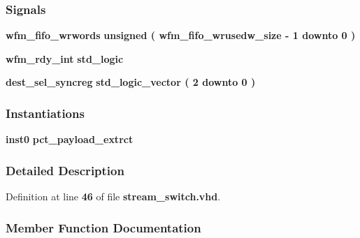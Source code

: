 \subsubsection*{Signals}
 \begin{DoxyCompactItemize}
\item 
{\bf wfm\+\_\+fifo\+\_\+wrwords} {\bfseries \textcolor{comment}{unsigned}\textcolor{vhdlchar}{ }\textcolor{vhdlchar}{(}\textcolor{vhdlchar}{ }\textcolor{vhdlchar}{ }\textcolor{vhdlchar}{ }\textcolor{vhdlchar}{ }{\bfseries {\bf wfm\+\_\+fifo\+\_\+wrusedw\+\_\+size}} \textcolor{vhdlchar}{-\/}\textcolor{vhdlchar}{ } \textcolor{vhdldigit}{1} \textcolor{vhdlchar}{ }\textcolor{keywordflow}{downto}\textcolor{vhdlchar}{ }\textcolor{vhdlchar}{ } \textcolor{vhdldigit}{0} \textcolor{vhdlchar}{ }\textcolor{vhdlchar}{)}\textcolor{vhdlchar}{ }} 
\item 
{\bf wfm\+\_\+rdy\+\_\+int} {\bfseries \textcolor{comment}{std\+\_\+logic}\textcolor{vhdlchar}{ }} 
\item 
{\bf dest\+\_\+sel\+\_\+syncreg} {\bfseries \textcolor{comment}{std\+\_\+logic\+\_\+vector}\textcolor{vhdlchar}{ }\textcolor{vhdlchar}{(}\textcolor{vhdlchar}{ }\textcolor{vhdlchar}{ } \textcolor{vhdldigit}{2} \textcolor{vhdlchar}{ }\textcolor{keywordflow}{downto}\textcolor{vhdlchar}{ }\textcolor{vhdlchar}{ } \textcolor{vhdldigit}{0} \textcolor{vhdlchar}{ }\textcolor{vhdlchar}{)}\textcolor{vhdlchar}{ }} 
\end{DoxyCompactItemize}
\subsubsection*{Instantiations}
 \begin{DoxyCompactItemize}
\item 
{\bf inst0}  {\bfseries pct\+\_\+payload\+\_\+extrct}   
\end{DoxyCompactItemize}


\subsubsection{Detailed Description}


Definition at line {\bf 46} of file {\bf stream\+\_\+switch.\+vhd}.



\subsubsection{Member Function Documentation}
